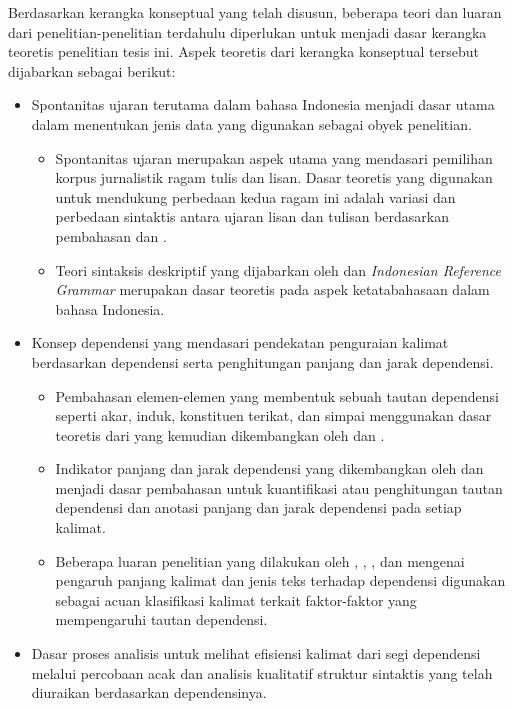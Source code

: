 Berdasarkan kerangka konseptual yang telah disusun, beberapa teori dan luaran dari penelitian-penelitian terdahulu diperlukan untuk menjadi dasar kerangka teoretis penelitian tesis ini. Aspek teoretis dari kerangka konseptual tersebut dijabarkan sebagai berikut:
\begin{itemize}
	\item Spontanitas ujaran terutama dalam bahasa Indonesia menjadi dasar utama dalam menentukan jenis data yang digunakan sebagai obyek penelitian.
	\begin{itemize}
		\item Spontanitas ujaran merupakan aspek utama yang mendasari pemilihan korpus jurnalistik ragam tulis dan lisan. Dasar teoretis yang digunakan untuk mendukung perbedaan kedua ragam ini adalah variasi dan perbedaan sintaktis antara ujaran lisan dan tulisan berdasarkan pembahasan \cite{biber1991variation} dan \cite{o1974syntactic}.
		\item Teori sintaksis deskriptif yang dijabarkan oleh \cite{kridalaksana1999deskriptif, kridalaksana2002struktur} dan \textit{Indonesian Reference Grammar} \citep{sneddon2010indonesian} merupakan dasar teoretis pada aspek ketatabahasaan dalam bahasa Indonesia.
	\end{itemize}
	\item Konsep dependensi yang mendasari pendekatan penguraian kalimat berdasarkan dependensi serta penghitungan panjang dan jarak dependensi.
	\begin{itemize}
		\item Pembahasan elemen-elemen yang membentuk sebuah tautan dependensi seperti akar, induk, konstituen terikat, dan simpai menggunakan dasar teoretis dari  \cite{tesniere1959elements} yang kemudian dikembangkan oleh \cite{heringer1993dependency} dan \cite{hudson2010introduction}.
		\item Indikator panjang dan jarak dependensi yang dikembangkan oleh \cite{liu2017dependency} dan \cite{gildea2010grammars} menjadi dasar pembahasan untuk kuantifikasi atau penghitungan tautan dependensi dan anotasi panjang dan jarak dependensi pada setiap kalimat.
		\item Beberapa luaran penelitian yang dilakukan oleh \cite{gibson1998linguistic}, \cite{hiranuma1999syntactic}, \cite{liu2009chinese}, dan \cite{wang2017effects} mengenai pengaruh panjang kalimat dan jenis teks terhadap dependensi digunakan sebagai acuan klasifikasi kalimat terkait faktor-faktor yang mempengaruhi tautan dependensi.
	\end{itemize}
	\item Dasar proses analisis untuk melihat efisiensi kalimat dari segi dependensi melalui percobaan acak dan analisis kualitatif struktur sintaktis yang telah diuraikan berdasarkan dependensinya.

\end{itemize}
